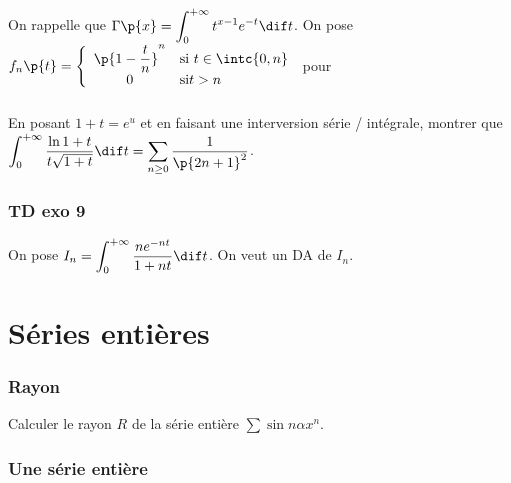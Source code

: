 \documentclass[a4paper,french,bookmarks]{book}
\begin{document}
    \subsection{}
    
    On rappelle que $\Gamma\p{x} = \displaystyle\int_0^{+\infty} t^{x-1}e^{-t}\dif t$. On pose $f_n\p{t} = \left\lbrace\begin{array}{cl}
        \p{1 - \dfrac{t}{n}}^n &\text{si} \ t \in \intc{0, n}  \\
        0 & \text{si} t > n
    \end{array}\right.$ pour 
    
    \subsection{}
    
    En posant $1 + t = e^u$ et en faisant une interversion série / intégrale, montrer que $\displaystyle\int_0^{+\infty} \dfrac{\ln{1 + t}}{t\sqrt{1 + t}}\dif t = \sum_{n \geq 0} \dfrac{1}{\p{2n + 1}^2}$.
    
    \subsection{TD exo 9}
    
    On pose $I_n = \displaystyle\int_0^{+\infty} \dfrac{ne^{-nt}}{1 + nt}\dif t$. On veut un DA de $I_n$.
    
    \chapter{Séries entières}
    
    \subsection{Rayon}
    
    Calculer le rayon $R$ de la série entière $\sum \sin{n\alpha}x^n$.
    
    
    \subsection{Une série entière}
    
\end{document}
